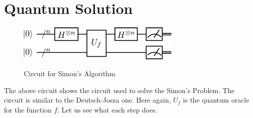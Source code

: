 \section{Quantum Solution}
\begin{figure}[h]
\centering
\includegraphics[width=0.7\textwidth]{images/simon.png}
\label{simon algo}
\caption{Circuit for Simon's Algorithm}
\end{figure}
The above circuit shows the circuit used to solve the Simon's Problem. The circuit is similar to the Deutsch-Josza one. Here again, $U_f$ is the quantum oracle for the function $f$. Let us see what each step does.
